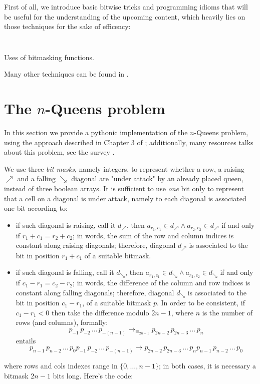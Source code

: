 

First of all, we introduce basic bitwise tricks and programming idioms that
will be useful for the understanding of the upcoming content, which heavily lies
on those techniques for the sake of efficency:
\inputminted[fontsize=\small,stripnl=false]{python}{backtracking/bits_clean.py}
\begin{margintable}[-3cm]
\inputminted[fontsize=\footnotesize,stripnl=false]{python}{backtracking/bits_clean_test.py}
\caption{Uses of bitmasking functions.}
\end{margintable}
Many other techniques can be found in \citep{Warren:2012:HD:2462741}.


\section{The $n$-Queens problem}

In this section we provide a pythonic implementation of the $n$-Queens problem,
using the approach described in Chapter $3$ of \citep{RuskeyCombGen}; additionally,
many resources talks about this problem, see the survey \citep{BELL20091}.

We use three \textit{bit masks}, namely integers, to
represent whether a row, a raising $\nearrow$ and a falling $\searrow$ diagonal
are "under attack" by an already placed queen, instead of three boolean arrays.
It is sufficient to use \textit{one} bit only to represent that a cell on a diagonal
is under attack, namely to each diagonal is associated one bit according to:
\begin{itemize}
\item if such diagonal is raising, call it $d_\nearrow$, then $a_{r_{1}, c_{1}}\in
  d_\nearrow \wedge a_{r_{2}, c_{2}} \in d_\nearrow$ if and only if
  $r_{1}+c_{1}=r_{2}+c_{2}$; in words, the sum of the row and column indices is
  constant along raising diagonals; therefore, diagonal $d_\nearrow$ is
  associated to the bit in position $r_{1}+c_{1}$ of a suitable bitmask.
\item if such diagonal is falling, call it $d_\searrow$, then $a_{r_{1},
  c_{1}}\in d_\searrow \wedge a_{r_{2}, c_{2}} \in d_\searrow$ if and only if
  $c_{1}-r_{1}=c_{2}-r_{2}$; in words, the difference of the column and row
  indices is constant along falling diagonals; therefore, diagonal $d_\searrow$
  is associated to the bit in position  $c_{1}-r_{1}$, of a suitable bitmask $p$.
  In order to be consistent, if $c_{1}-r_{1} < 0$ then take the difference modulo
  $2n-1$, where $n$ is the number of rows (and columns), formally:
  \begin{displaymath}
  p_{-1}\,p_{-2}\,\ldots\,p_{-(n-1)} \rightarrow_{\equiv_{2n-1}}
  p_{2n-2}\,p_{2n-3}\,\ldots\,p_{n}
  \end{displaymath}
  entails
  \begin{displaymath}
  p_{n-1}\,p_{n-2}\,\ldots\,p_{0}p_{-1}\,p_{-2}\,\ldots\,p_{-(n-1)} \rightarrow
  p_{2n-2}\,p_{2n-3}\,\ldots\,p_{n}p_{n-1}\,p_{n-2}\,\ldots\,p_{0}
  \end{displaymath}
\end{itemize}
where rows and cols indexes range in $\lbrace 0,\ldots,n-1 \rbrace$; in both
cases, it is necessary a bitmask $2n-1$ bits long. Here's the code:

